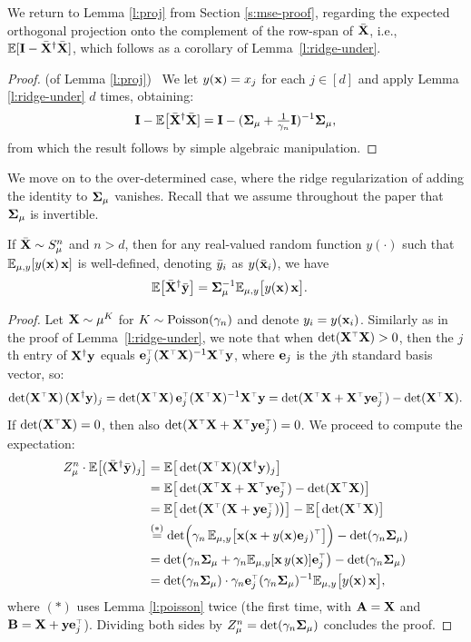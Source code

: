 \documentclass[11pt]{article}
\begin{document}
We return to Lemma \ref{l:proj} from Section \ref{s:mse-proof}, regarding the expected orthogonal
projection onto the complement of the row-span of ${\bar{\mathbf X}}$, i.e.,
$\mathbb E[\mathbf I-{\bar{\mathbf X}}^\dagger{\bar{\mathbf X}}]$, which follows as a corollary of Lemma~\ref{l:ridge-under}.
\begin{proof} (of Lemma \ref{l:proj}) \
  We let $y(\mathbf x)=x_j$ for each $j\in[d]$ and apply Lemma
  \ref{l:ridge-under} $d$ times, obtaining:
  \begin{align*}
    \mathbf I - \mathbb E\big[{\bar{\mathbf X}}^\dagger{\bar{\mathbf X}}] = \mathbf I -
    (\mathbf{\Sigma}_\mu+\tfrac1{\gamma_n}\mathbf I)^{-1}\mathbf{\Sigma}_\mu,
  \end{align*}
  from which the result follows by simple algebraic manipulation.
\end{proof}
We move on to the over-determined case, where the ridge regularization
of adding the identity to $\mathbf{\Sigma}_\mu$ vanishes. Recall that we
assume throughout the paper that $\mathbf{\Sigma}_\mu$ is invertible.
\begin{lemma}\label{l:ridge-over}
  If ${\bar{\mathbf X}}\sim S_\mu^n$ and $n>d$, then for any real-valued random function $y(\cdot)$
  such that $\mathbb E_{\mu,y}[y(\mathbf x)\,\mathbf x]$ is well-defined,
denoting ${\bar y}_i$ as $y(\bar{\mathbf x}_i)$, we have
 \begin{align*}
  \mathbb E\big[{\bar{\mathbf X}}^\dagger \bar{\mathbf y}\big]
  &=\mathbf{\Sigma}_\mu^{-1}\mathbb E_{\mu,y}\big[y(\mathbf x)\,\mathbf x\big].
\end{align*}
\end{lemma}
\begin{proof}
   Let $\mathbf X\sim\mu^K$ for $K\sim{\operatorname{Poisson}}(\gamma_n)$ and denote
   $y_i=y(\mathbf x_i)$. Similarly as in the proof of
   Lemma~\ref{l:ridge-under}, we note that when $\det(\X^\top\X)>0$,
   then 
  the $j$th entry of $\mathbf X^\dagger\mathbf y$ equals
  $\e_j^\top(\X^\top\X)^{-1}\X^\top\y$, where $\mathbf e_j$ is the $j$th
standard basis vector, so:
\begin{align*}
  \det(\X^\top\X)\,(\X^\dagger\y)_j =
  \det(\X^\top\X)\, \e_j^\top(\X^\top\X)^{-1}\X^\top\y =
  \det(\X^\top\X+\X^\top\y\e_j^\top) - \det(\X^\top\X).
\end{align*}
If $\det(\X^\top\X)=0$, then also
$\det(\X^\top\X+\X^\top\y\e_j^\top)=0$. We proceed to compute the
expectation:
\begin{align*}
Z_\mu^n\cdot\E\big[(\Xb^\dagger\ybb)_j\big]
  &=  \E\big[\det(\X^\top\X)(\X^\dagger\y)_j\big] \\
  &= \E\big[\det(\X^\top\X+\X^\top\y\e_j^\top)-\det(\X^\top\X)\big]  \\
  &=\E\big[\det\!\big(\X^\top(\X+\y\e_j^\top)\big)\big] - \E\big[\det(\X^\top\X)\big]\\
  &\overset{(*)}{=}\det\!\Big(
    \gamma_n\,\E_{\mu,y}\big[\x(\x+ y(\x)\e_j)^\top\big]\Big)
    -\det(\gamma_n\Sigmab_\mu)\\
  &=\det\!\big(\gamma_n\Sigmab_\mu + \gamma_n\E_{\mu,y}[\x\,y(\x)]\e_j^\top\big)
    -\det(\gamma_n\Sigmab_\mu)\\
  &=\det(\gamma_n\Sigmab_\mu)\cdot
    \gamma_n\e_j^\top(\gamma_n\Sigmab_\mu)^{-1}\E_{\mu,y}\big[y(\x)\,\x\big],
\end{align*}
where $(*)$ uses Lemma \ref{l:poisson} twice (the first time, with
$\mathbf A=\mathbf X$ and $\B=\X+\y\e_j^\top$). Dividing both sides by
$Z_\mu^n=\det(\gamma_n\mathbf{\Sigma}_\mu)$ concludes the proof. 
\end{proof}
\end{document}
